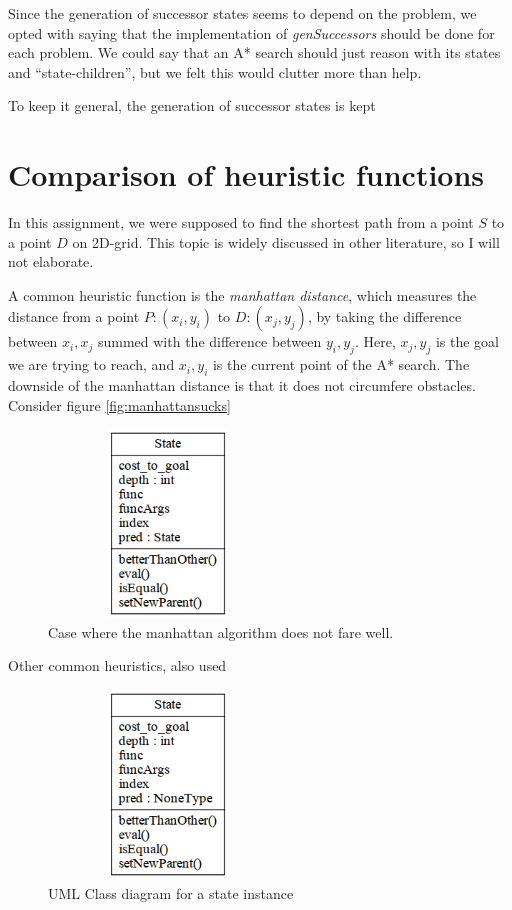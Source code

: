 \documentclass[journal]{IEEEtran}
\begin{document}
Since the generation of successor states seems to depend on the problem, we
opted with saying that the implementation of \textit{genSuccessors} should be done
for each problem. We could say that an A* search should just reason 
with its states and ``state-children'', but we felt this would clutter
more than help.

To keep it general, the generation of successor states is kept



\section{Comparison of heuristic functions}
In this assignment, we were supposed to find the shortest path
from a point $S$ to a point $D$ on 2D-grid. This topic is widely discussed in other
literature, so I will not elaborate.

A common heuristic function is the \textit{manhattan distance}, which measures the 
distance from a point $P: (x_{i},y_{i})$ to $D: (x_{j},y_{j})$, by taking the difference
between $x_i, x_j$ summed with the difference between $y_i, y_j$. Here, $x_j,y_j$ is 
the goal we are trying to reach, and $x_i, y_i$  is the current point of the A*
search.
The downside of the manhattan distance is that it does not circumfere obstacles.
Consider figure \autoref{fig:manhattansucks}

\begin{figure}[Hb]
\centering
\includegraphics[height=5cm,keepaspectratio,width=2.5in]{fig/problem.png}%
\caption{Case where the manhattan algorithm does not fare well.}
\label{fig:manhattansucks}
\end{figure}

Other common heuristics, also used




\begin{figure}[Hb]
\centering
\includegraphics[height=5cm,keepaspectratio,width=2.5in]{fig/state.png}%
\caption{UML Class diagram for a state instance}
\label{fig:UMLstate}
\end{figure}
\end{document}
